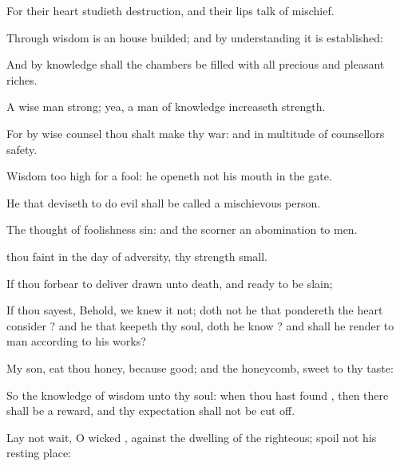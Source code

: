 {For their
heart
studieth
destruction, and their
lips
talk of
mischief.


\par }{\PP {}Through
wisdom is an
house
builded; and by
understanding it is
established:

And by
knowledge shall the
chambers be
filled with all
precious and
pleasant
riches.

A
wise
man
{}
strong; yea, a
man of
knowledge
increaseth
strength.

For by wise
counsel thou shalt
make thy
war: and in
multitude of
counsellors
{}
safety.


\par }{\PP {}Wisdom
{} too
high for a
fool: he
openeth not his
mouth in the
gate.

He that
deviseth to do
evil shall be
called a
mischievous
person.

The
thought of
foolishness
{}
sin: and the
scorner
{} an
abomination to
men.

 thou
faint in the
day of
adversity, thy
strength
{}
small.


\par }{\PP {}If thou
forbear to
deliver
{}
drawn unto
death, and
{}
ready to be
slain;

If thou
sayest, Behold, we
knew it not; doth not he that
pondereth the
heart
consider
{}? and he that
keepeth thy
soul, doth
{} he
know
{}? and shall
{} he
render to
{}
man according to his
works?


\par }{\PP {}My
son,
eat thou
honey, because
{}
good; and the
honeycomb,
{}
sweet to thy
taste:

So
{} the
knowledge of
wisdom
{} unto thy
soul: when thou hast
found
{}, then there shall
be a
reward, and thy
expectation shall not be cut
off.


\par }{\PP {}Lay not
wait, O
wicked
{}, against the
dwelling of the
righteous;
spoil not his resting
place:

}
